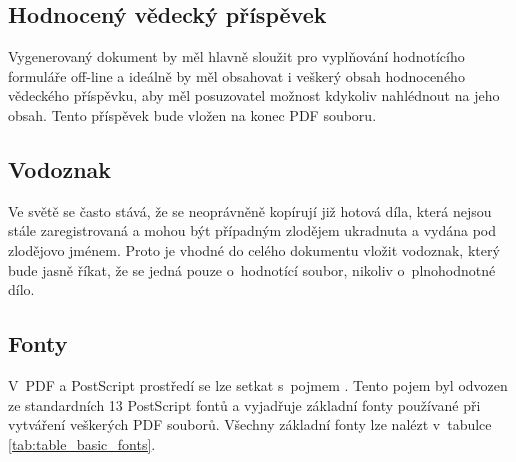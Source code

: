 \subsection{Hodnocený vědecký příspěvek}
Vygenerovaný dokument by měl hlavně sloužit pro vyplňování hodnotícího formuláře off-line a ideálně by měl obsahovat i veškerý obsah hodnoceného vědeckého příspěvku, aby měl posuzovatel možnost kdykoliv nahlédnout na jeho obsah. Tento příspěvek bude vložen na konec PDF souboru.

\subsection{Vodoznak}
Ve světě se často stává, že se neoprávněně kopírují již hotová díla, která nejsou stále zaregistrovaná a mohou být případným zlodějem ukradnuta a vydána pod zlodějovo jménem. Proto je vhodné do celého dokumentu vložit vodoznak, který bude jasně říkat, že se jedná pouze o~hodnotící soubor, nikoliv o~plnohodnotné dílo.

\subsection{Fonty}
\label{subsec:fonty}
V~PDF a PostScript prostředí se lze setkat s~pojmem . Tento pojem byl odvozen ze standardních 13 PostScript fontů a vyjadřuje základní fonty používané při vytváření veškerých PDF souborů. Všechny základní fonty lze nalézt v~tabulce \ref{tab:table_basic_fonts}.

